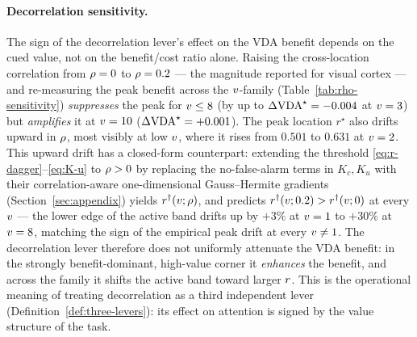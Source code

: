 \paragraph{Decorrelation sensitivity.}
The sign of the decorrelation lever's effect on the VDA benefit depends
on the cued value, not on the benefit/cost ratio alone. Raising the
cross-location correlation from $\rho = 0$ to $\rho = 0.2$ --- the
magnitude reported for visual cortex \cite{CohenMaunsell2009} --- and
re-measuring the peak benefit across the $v$-family
(Table~\ref{tab:rho-sensitivity}) \emph{suppresses} the peak for
$v \le 8$ (by up to $\Delta\mathrm{VDA}^\star = -0.004$ at $v = 3$) but
\emph{amplifies} it at $v = 10$ ($\Delta\mathrm{VDA}^\star = +0.001$). The
peak location $r^\star$ also drifts upward in $\rho$, most visibly at
low $v$, where it rises from $0.501$ to $0.631$ at $v = 2$. This
upward drift has a closed-form counterpart: extending the threshold
\eqref{eq:r-dagger}--\eqref{eq:K-u} to $\rho > 0$ by replacing the
no-false-alarm terms in $K_c, K_u$ with their correlation-aware
one-dimensional Gauss--Hermite gradients (Section~\ref{sec:appendix})
yields $r^{\dagger}(v;\rho)$, and predicts
$r^{\dagger}(v; 0.2) > r^{\dagger}(v; 0)$ at every $v$ --- the lower
edge of the active band drifts up by $+3\%$ at $v = 1$ to $+30\%$ at
$v = 8$, matching the sign of the empirical peak drift at every
$v \neq 1$. The decorrelation lever therefore does not uniformly
attenuate the VDA benefit: in the strongly benefit-dominant, high-value
corner it \emph{enhances} the benefit, and across the family it shifts
the active band toward larger $r$. This is the operational meaning
of treating decorrelation as a third independent lever
(Definition~\ref{def:three-levers}): its effect on attention is
signed by the value structure of the task.

